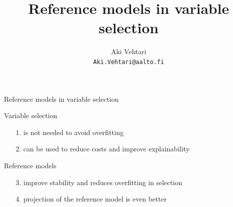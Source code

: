 \documentclass[english,t]{beamer}
\title[]{Reference models in variable selection}
\subtitle{}
\author[Aki.Vehtari@aalto.fi -- @avehtari@bayes.club]{Aki Vehtari \\ 
  \small{\texttt{Aki.Vehtari@aalto.fi}}}  %
\institute[Aalto]{}
\date[]{}
\newlength\myheight
\newlength\mydepth
\newcommand*\inlinegraphics[2][1]{%
  \settototalheight\myheight{Xygp}%
  \settodepth\mydepth{Xygp}%
  \raisebox{-#1\mydepth}{\texttt{[image: \#2]}}%
}
\begin{document}
  

     


    


\begin{frame}{Reference models in variable selection}

  Variable selection
  \begin{itemize}
  \item[1.] is not needed to avoid overfitting
  \item[2.] can be used to reduce costs and improve explainability
  \end{itemize}

  Reference models
  \begin{itemize}
  \item[3.] improve stability and reduces overfitting in selection
  \item[4.] projection of the reference model is even better
  \end{itemize}

\end{frame}
\end{document}
